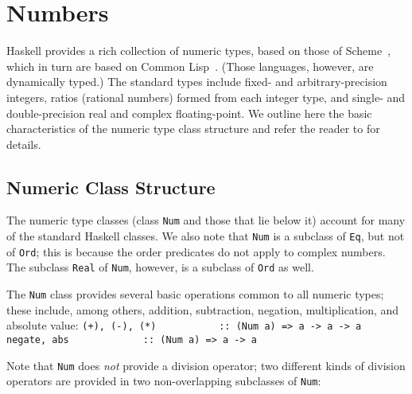 
\section{Numbers}

Haskell provides a rich collection of numeric types, based on those of
Scheme~\cite{RRRRS}, which in turn are based on Common
Lisp~\cite{steele:common-lisp}.  (Those languages, however, are
dynamically typed.)  The standard types include fixed- and
arbitrary-precision integers, ratios (rational numbers) formed from
each integer type, and single- and double-precision real and complex
floating-point.  We outline here the basic characteristics of the
numeric type class structure and refer the reader to
 for details.

\subsection{Numeric Class Structure}

The numeric type classes (class \mbox{\tt Num} and those that lie below it)
account for 
many of the standard Haskell classes.  We also note that \mbox{\tt Num}
is a subclass of \mbox{\tt Eq}, but not of \mbox{\tt Ord}; this is because the order
predicates do not apply to complex numbers.  The subclass \mbox{\tt Real}
of \mbox{\tt Num}, however, is a subclass of \mbox{\tt Ord} as well.

The \mbox{\tt Num} class provides several basic operations common to all
numeric types; these include, among others, addition, subtraction,
negation, multiplication, and absolute value:
\bprog
\mbox{\tt (+),\ (-),\ (*)\ \ \ \ \ \ \ \ \ \ \ ::\ (Num\ a)\ =>\ a\ ->\ a\ ->\ a}\\
\mbox{\tt negate,\ abs\ \ \ \ \ \ \ \ \ \ \ \ \ ::\ (Num\ a)\ =>\ a\ ->\ a}
\eprog
{}

Note that \mbox{\tt Num} does {\em not} provide a division operator; two
different kinds of division operators are provided in two non-overlapping
subclasses of \mbox{\tt Num}:

